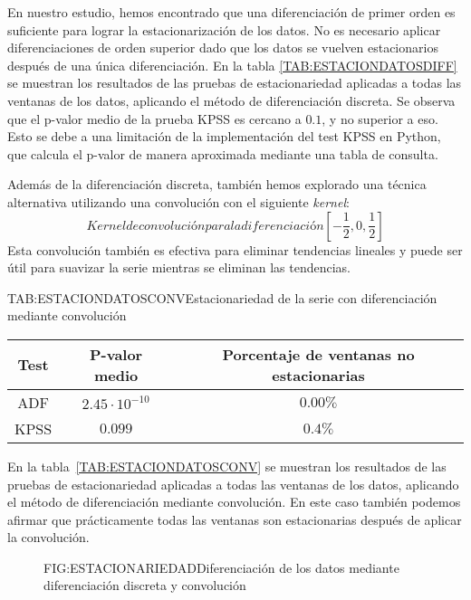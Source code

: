 En nuestro estudio, hemos encontrado que una diferenciación de primer orden es suficiente para lograr la estacionarización de los datos. No es necesario aplicar diferenciaciones de orden superior dado que los datos se vuelven estacionarios después de una única diferenciación. En la tabla \ref{TAB:ESTACIONDATOSDIFF} se muestran los resultados de las pruebas de estacionariedad aplicadas a todas las ventanas de los datos, aplicando el método de diferenciación discreta. Se observa que el p-valor medio de la prueba KPSS es cercano a $0.1$, y no superior a eso. Esto se debe a una limitación de la implementación del test KPSS en Python, que calcula el p-valor de manera aproximada mediante una tabla de consulta. 

Además de la diferenciación discreta, también hemos explorado una técnica alternativa utilizando una convolución con el siguiente \textit{kernel}:
\begin{equation}{\textit{Kernel} de convolución para la diferenciación}   
    [-\frac{1}{2}, 0, \frac{1}{2}]
\end{equation}
Esta convolución también es efectiva para eliminar tendencias lineales y puede ser útil para suavizar la serie mientras se eliminan las tendencias.

\begin{table}[Estacionariedad de la serie con diferenciación mediante convolución]{TAB:ESTACIONDATOSCONV}{Estacionariedad de la serie con diferenciación mediante convolución}
    \begin{tabular}{|c|c|c|}
        \hline
        \textbf{Test} & \textbf{P-valor medio} & \textbf{Porcentaje de ventanas no estacionarias} \\
        \hline
        ADF & $2.45\cdot 10^{-10}$ & $0.00\%$ \\
        KPSS & $0.099$ & $0.4\%$ \\
        \hline
    \end{tabular}
\end{table}

En la tabla~\ref{TAB:ESTACIONDATOSCONV} se muestran los resultados de las pruebas de estacionariedad aplicadas a todas las ventanas de los datos, aplicando el método de diferenciación mediante convolución. En este caso también podemos afirmar que prácticamente todas las ventanas son estacionarias después de aplicar la convolución.

\begin{figure}[Diferenciación de los datos mediante diferenciación discreta y convolución]{FIG:ESTACIONARIEDAD}{Diferenciación de los datos mediante diferenciación discreta y convolución}
    \label{FIG:ESTACIONARIEDAD}
\end{figure}

